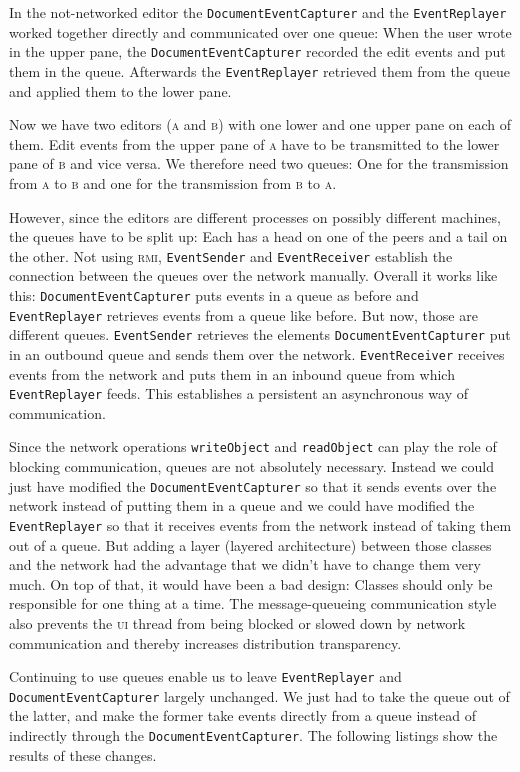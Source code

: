 \documentclass[a4paper,draft,12pt,oneside,article,table]{memoir}
\newcommand{\mil}[1]{\texttt{#1}}
\begin{document}
In the not-networked editor the \mil{DocumentEventCapturer} and the
\mil{EventReplayer} worked together directly and communicated over one
queue: When the user wrote in the upper pane, the
\mil{DocumentEventCapturer} recorded the edit events and put them in
the queue. Afterwards the \mil{EventReplayer} retrieved them from the
queue and applied them to the lower pane.

Now we have two editors (\textsc{a} and \textsc{b}) with one lower and
one upper pane on each of them. Edit events from the upper pane of
\textsc{a} have to be transmitted to the lower pane of \textsc{b} and
vice versa. We therefore need two queues: One for the transmission
from \textsc{a} to \textsc{b} and one for the transmission from
\textsc{b} to \textsc{a}.

However, since the editors are different processes on possibly
different machines, the queues have to be split up: Each has a head on
one of the peers and a tail on the other.  Not using \textsc{rmi},
\mil{EventSender} and \mil{EventReceiver} establish the connection
between the queues over the network manually. Overall it works like
this: \mil{DocumentEventCapturer} puts events in a queue as before and
\mil{EventReplayer} retrieves events from a queue like before. But
now, those are different queues.  \mil{EventSender} retrieves the
elements \mil{DocumentEventCapturer} put in an outbound queue and
sends them over the network.  \mil{EventReceiver} receives events from
the network and puts them in an inbound queue from which
\mil{EventReplayer} feeds. This establishes a persistent an
asynchronous way of communication.

Since the network operations \mil{writeObject} and \mil{readObject}
can play the role of blocking communication, queues are not absolutely
necessary. Instead we could just have modified the
\mil{DocumentEventCapturer} so that it sends events over the network
instead of putting them in a queue and we could have modified the
\mil{EventReplayer} so that it receives events from the network
instead of taking them out of a queue. But adding a layer (layered
architecture) between those classes and the network had the advantage
that we didn't have to change them very much.  On top of that, it
would have been a bad design: Classes should only be responsible for
one thing at a time. The message-queueing communication style also
prevents the \textsc{ui} thread from being blocked or slowed down by
network communication and thereby increases distribution transparency.

Continuing to use queues enable us to leave \mil{EventReplayer} and
\mil{DocumentEventCapturer} largely unchanged. We just had to take the
queue out of the latter, and make the former take events directly from
a queue instead of indirectly through the
\mil{DocumentEventCapturer}. The following listings show the results
of these changes.
\end{document}
